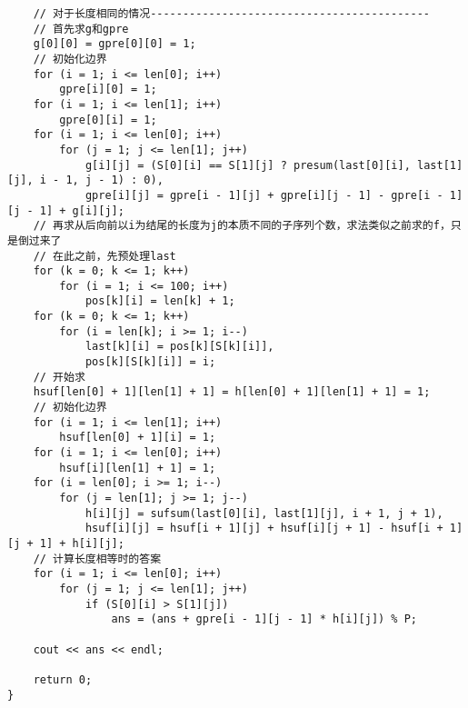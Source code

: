 \begin{lstlisting}
    // 对于长度相同的情况-------------------------------------------
    // 首先求g和gpre
    g[0][0] = gpre[0][0] = 1;
    // 初始化边界
    for (i = 1; i <= len[0]; i++)
        gpre[i][0] = 1;
    for (i = 1; i <= len[1]; i++)
        gpre[0][i] = 1;
    for (i = 1; i <= len[0]; i++)
        for (j = 1; j <= len[1]; j++)
            g[i][j] = (S[0][i] == S[1][j] ? presum(last[0][i], last[1][j], i - 1, j - 1) : 0),
            gpre[i][j] = gpre[i - 1][j] + gpre[i][j - 1] - gpre[i - 1][j - 1] + g[i][j];
    // 再求从后向前以i为结尾的长度为j的本质不同的子序列个数，求法类似之前求的f，只是倒过来了
    // 在此之前，先预处理last
    for (k = 0; k <= 1; k++)
        for (i = 1; i <= 100; i++)
            pos[k][i] = len[k] + 1;
    for (k = 0; k <= 1; k++)
        for (i = len[k]; i >= 1; i--)
            last[k][i] = pos[k][S[k][i]],
            pos[k][S[k][i]] = i;
    // 开始求
    hsuf[len[0] + 1][len[1] + 1] = h[len[0] + 1][len[1] + 1] = 1;
    // 初始化边界
    for (i = 1; i <= len[1]; i++)
        hsuf[len[0] + 1][i] = 1;
    for (i = 1; i <= len[0]; i++)
        hsuf[i][len[1] + 1] = 1;
    for (i = len[0]; i >= 1; i--)
        for (j = len[1]; j >= 1; j--)
            h[i][j] = sufsum(last[0][i], last[1][j], i + 1, j + 1),
            hsuf[i][j] = hsuf[i + 1][j] + hsuf[i][j + 1] - hsuf[i + 1][j + 1] + h[i][j];
    // 计算长度相等时的答案
    for (i = 1; i <= len[0]; i++)
        for (j = 1; j <= len[1]; j++)
            if (S[0][i] > S[1][j])
                ans = (ans + gpre[i - 1][j - 1] * h[i][j]) % P;

    cout << ans << endl;

    return 0;
}
\end{lstlisting}